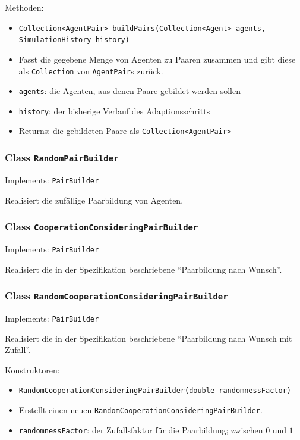 \documentclass[parskip=full,11pt]{scrartcl}
\begin{document}
Methoden:
\begin{itemize}\itemsep -10pt
\item \texttt{Collection<AgentPair> buildPairs(Collection<Agent> agents, SimulationHistory history)}
\item[] Fasst die gegebene Menge von Agenten zu Paaren zusammen und gibt diese als \texttt{Collection} von \texttt{AgentPair}s zurück.
\item[] \texttt{agents}: die Agenten, aus denen Paare gebildet werden sollen
\item[] \texttt{history}: der bisherige Verlauf des Adaptionsschritts
\item[] Returns: die gebildeten Paare als \texttt{Collection<AgentPair>}
\end{itemize}

\subsubsection{Class \texttt{RandomPairBuilder}}
Implements: \texttt{PairBuilder}

Realisiert die zufällige Paarbildung von Agenten.

\subsubsection{Class \texttt{CooperationConsideringPairBuilder}}
Implements: \texttt{PairBuilder}

Realisiert die in der Spezifikation beschriebene \enquote{Paarbildung nach Wunsch}.

\subsubsection{Class \texttt{RandomCooperationConsideringPairBuilder}}
Implements: \texttt{PairBuilder}

Realisiert die in der Spezifikation beschriebene \enquote{Paarbildung nach Wunsch mit Zufall}.

Konstruktoren:
\begin{itemize}\itemsep -10pt
\item \texttt{RandomCooperationConsideringPairBuilder(double randomnessFactor)}
\item[] Erstellt einen neuen \texttt{RandomCooperationConsideringPairBuilder}.
\item[] \texttt{randomnessFactor}: der Zufallsfaktor für die Paarbildung; zwischen \(0\) und \(1\)
\end{itemize}
\end{document}
